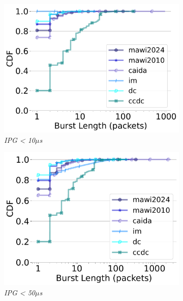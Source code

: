 \begin{figure}[t]
\begin{subfigure}[t]{.24\linewidth}
    \includegraphics[width=\linewidth]{figs/aggregate_ipg_burstsize_pkt_cdf_10.pdf}
    \vspace{-6mm}
    \caption{\small{\textit{IPG < 10$\mu$s}}}
 \end{subfigure}
\begin{subfigure}[t]{.24\linewidth}
 \centering
    \includegraphics[width=\linewidth]{figs/aggregate_ipg_burstsize_pkt_cdf_50.pdf}
    \vspace{-6mm}
    \caption{\small{\textit{IPG < 50$\mu$s}}}
\end{subfigure}
\begin{subfigure}[t]{.24\linewidth}
 \centering

\end{subfigure}
\end{figure}
